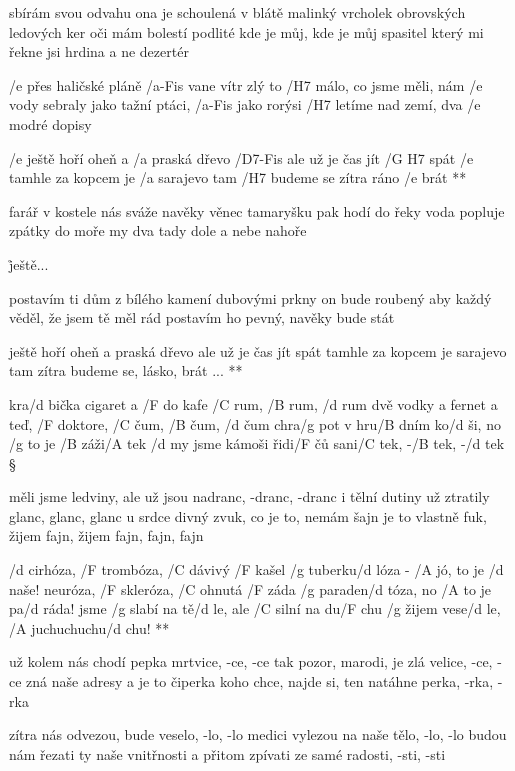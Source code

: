 sbírám svou odvahu ona je schoulená v blátě
malinký vrcholek obrovských ledových ker
oči mám bolestí podlité
kde je můj, kde je můj spasitel
který mi řekne jsi hrdina a ne dezertér




/e přes haličské pláně /a-Fis vane vítr zlý
to /H7 málo, co jsme měli, nám /e vody sebraly
jako tažní ptáci, /a-Fis jako rorýsi
/H7 letíme nad zemí, dva /e modré dopisy

\R  /e ještě hoří oheň a /a praská dřevo
    /D7-Fis ale už je čas jít /{G H7} spát
    /e tamhle za kopcem je /a sarajevo
    tam /H7 budeme se zítra ráno /e brát **

farář v kostele nás sváže navěky
věnec tamaryšku pak hodí do řeky
voda popluje zpátky do moře
my dva tady dole a nebe nahoře

\r  ještě...

postavím ti dům z bílého kamení
dubovými prkny on bude roubený
aby každý věděl, že jsem tě měl rád
postavím ho pevný, navěky bude stát

\R  ještě hoří oheň a praská dřevo
    ale už je čas jít spát
    tamhle za kopcem je sarajevo
    tam zítra budeme se, lásko, brát ... **





kra/d bička cigaret a /F do kafe /C rum, /B rum, /d rum
dvě vodky a fernet a teď, /F doktore, /C čum, /B čum, /d čum
chra/g pot v hru/B dním ko/d ši, no /g to je /B záži/A tek
/d my jsme kámoši řidi/F čů sani/C tek, -/B tek, -/d tek \S

měli jsme ledviny, ale už jsou nadranc, -dranc, -dranc
i tělní dutiny už ztratily glanc, glanc, glanc
u srdce divný zvuk, co je to, nemám šajn
je to vlastně fuk, žijem fajn, žijem fajn, fajn, fajn

\R  /d cirhóza, /F trombóza, /C dávivý /F kašel
    /g tuberku/d lóza - /A jó, to je /d naše!
    neuróza, /F skleróza, /C ohnutá /F záda
    /g paraden/d tóza, no /A to je pa/d ráda!
    jsme /g slabí na tě/d le, ale /C silní na du/F chu
    /g žijem vese/d le, /A juchuchuchu/d chu! **

už kolem nás chodí pepka mrtvice, -ce, -ce
tak pozor, marodi, je zlá velice, -ce, -ce
zná naše adresy a je to čiperka
koho chce, najde si, ten natáhne perka, -rka, -rka \s

zítra nás odvezou, bude veselo, -lo, -lo
medici vylezou na naše tělo, -lo, -lo
budou nám řezati ty naše vnitřnosti
a přitom zpívati ze samé radosti, -sti, -sti

